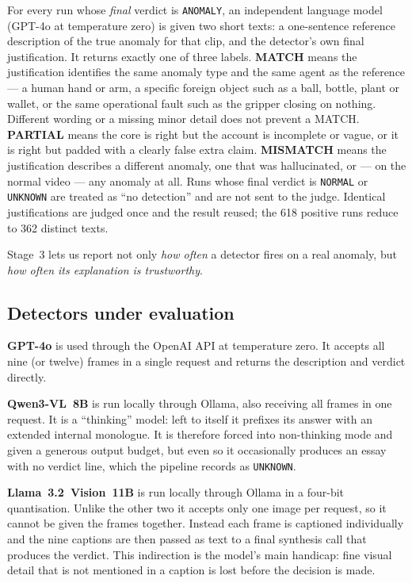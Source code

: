 \documentclass[11pt,a4paper]{article}
\begin{document}
For every run whose \emph{final} verdict is \texttt{ANOMALY}, an
independent language model (GPT-4o at temperature zero) is given two short
texts: a one-sentence reference description of the true anomaly for that
clip, and the detector's own final justification. It returns exactly one
of three labels. \textbf{MATCH} means the justification identifies the
same anomaly type and the same agent as the reference --- a human
hand or arm, a specific foreign object such as a ball, bottle, plant or
wallet, or the same operational fault such as the gripper closing on
nothing. Different wording or a missing minor detail does not prevent a
MATCH. \textbf{PARTIAL} means the core is right but the account is
incomplete or vague, or it is right but padded with a clearly false extra
claim. \textbf{MISMATCH} means the justification describes a different
anomaly, one that was hallucinated, or --- on the normal video --- any
anomaly at all. Runs whose final verdict is \texttt{NORMAL} or
\texttt{UNKNOWN} are treated as ``no detection'' and are not sent to the
judge. Identical justifications are judged once and the result reused; the
618 positive runs reduce to 362 distinct texts.

Stage~3 lets us report not only \emph{how often} a detector fires on a
real anomaly, but \emph{how often its explanation is trustworthy}.

\subsection{Detectors under evaluation}

\textbf{GPT-4o} is used through the OpenAI API at temperature zero. It
accepts all nine (or twelve) frames in a single request and returns the
description and verdict directly.

\textbf{Qwen3-VL~8B} is run locally through Ollama, also receiving all
frames in one request. It is a ``thinking'' model: left to itself it
prefixes its answer with an extended internal monologue. It is therefore
forced into non-thinking mode and given a generous output budget, but even
so it occasionally produces an essay with no verdict line, which the
pipeline records as \texttt{UNKNOWN}.

\textbf{Llama~3.2~Vision~11B} is run locally through Ollama in a
four-bit quantisation. Unlike the other two it accepts only one image per
request, so it cannot be given the frames together. Instead each frame is
captioned individually and the nine captions are then passed as text to a
final synthesis call that produces the verdict. This indirection is the
model's main handicap: fine visual detail that is not mentioned in a
caption is lost before the decision is made.
\end{document}
